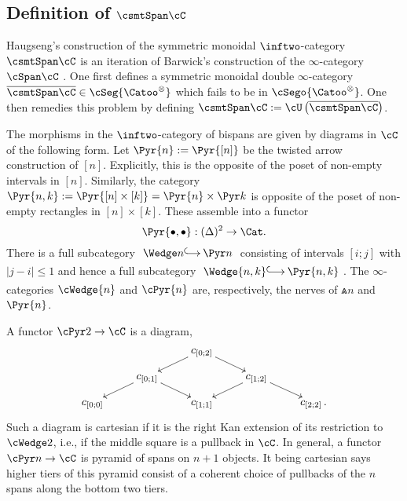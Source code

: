 \documentclass[a4paper]{article}
\numberwithin{equation}{section}
\begin{document}
\subsection{Definition of \texorpdfstring{$\csmtSpan \cC$}{Span(C)}}
\label{BispanConst}
Haugseng's construction of the symmetric monoidal $\inftwo$-category $\csmtSpan \cC$ is an iteration of Barwick's construction of the $\infty$-category $\cSpan \cC$ \cite{BarwickSpan}. One first defines a symmetric monoidal double $\infty$-category $\overline{\csmtSpan \cC} \in \cSeg {\Catoo^\otimes}$ which fails to be in $\cSego {\Catoo^\otimes}$. One then remedies this problem by defining $\csmtSpan \cC := \cU \left(\overline{\csmtSpan \cC}\right)$.


The morphisms in the $\inftwo$-category of bispans are given by diagrams in $\cC$ of the following form. Let $\Pyr{n}:=\Pyr{[n]}$ be the twisted arrow construction of $[n]$. Explicitly, this is the opposite of the poset of non-empty intervals in $[n]$. Similarly, the category $\Pyr{n,k} := \Pyr{[n] \times [k]} = \Pyr{n} \times \Pyr k$ is opposite of the poset of non-empty rectangles in $[n] \times [k]$. These assemble into a functor 
\begin{equation*}
\Pyr {\bullet,\bullet}: (\Delta)^2 \to \Cat. 
\end{equation*}
There is a full subcategory $\xymatrixcolsep{.95pc}\xymatrix{\Wedge n \ar@{^{(}->}[r] & \Pyr n}$ consisting of intervals $[i;j]$ with $|j-i| \leq 1$ and hence a full subcategory  $\xymatrixcolsep{1.1pc}\xymatrix{\Wedge {n,k} \ar@{^{(}->}[r] & \Pyr {n,k}}$. The $\infty$-categories $\cWedge {n}$ and $\cPyr {n}$ are, respectively, the nerves of $\Wedge {n}$ and $\Pyr {n}$.

\begin{exam}
\label{Sigmaintuit}
 A functor $\cPyr 2 \to \cC$ is a diagram,
\begin{equation*}
  \xymatrixrowsep{.8pc}\xymatrix{ & & c_{[0;2]} \ar[rd] \ar[ld] & & \\
  & c_{[0;1]} \ar[rd] \ar[ld] & & c_{[1;2]} \ar[rd] \ar[ld] & \\
  c_{[0;0]} & & c_{[1;1]} & & c_{[2;2]} \, . }
 \end{equation*}
Such a diagram is cartesian if it is the right Kan extension of its restriction to $\cWedge 2$, i.e., if the middle square is a pullback in $\cC$. In general, a functor $\cPyr n \to \cC$ is pyramid of spans on $n+1$ objects. It being cartesian says higher tiers of this pyramid consist of a coherent choice of pullbacks of the $n$ spans along the bottom two tiers. 
 \end{exam}
 
\end{document}
